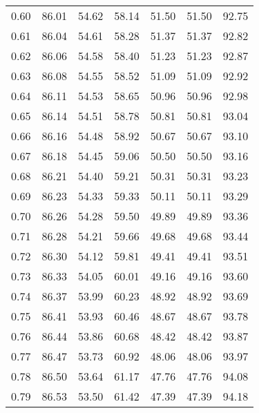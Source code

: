 \begin{tabular}{|c|c|c|c|c|c|c|}
      0.60 &     86.01 &     54.62 &      58.14 &   51.50 &      51.50 &         92.75 \\
      0.61 &     86.04 &     54.61 &      58.28 &   51.37 &      51.37 &         92.82 \\
      0.62 &     86.06 &     54.58 &      58.40 &   51.23 &      51.23 &         92.87 \\
      0.63 &     86.08 &     54.55 &      58.52 &   51.09 &      51.09 &         92.92 \\
      0.64 &     86.11 &     54.53 &      58.65 &   50.96 &      50.96 &         92.98 \\
      0.65 &     86.14 &     54.51 &      58.78 &   50.81 &      50.81 &         93.04 \\
      0.66 &     86.16 &     54.48 &      58.92 &   50.67 &      50.67 &         93.10 \\
      0.67 &     86.18 &     54.45 &      59.06 &   50.50 &      50.50 &         93.16 \\
      0.68 &     86.21 &     54.40 &      59.21 &   50.31 &      50.31 &         93.23 \\
      0.69 &     86.23 &     54.33 &      59.33 &   50.11 &      50.11 &         93.29 \\
      0.70 &     86.26 &     54.28 &      59.50 &   49.89 &      49.89 &         93.36 \\
      0.71 &     86.28 &     54.21 &      59.66 &   49.68 &      49.68 &         93.44 \\
      0.72 &     86.30 &     54.12 &      59.81 &   49.41 &      49.41 &         93.51 \\
      0.73 &     86.33 &     54.05 &      60.01 &   49.16 &      49.16 &         93.60 \\
      0.74 &     86.37 &     53.99 &      60.23 &   48.92 &      48.92 &         93.69 \\
      0.75 &     86.41 &     53.93 &      60.46 &   48.67 &      48.67 &         93.78 \\
      0.76 &     86.44 &     53.86 &      60.68 &   48.42 &      48.42 &         93.87 \\
      0.77 &     86.47 &     53.73 &      60.92 &   48.06 &      48.06 &         93.97 \\
      0.78 &     86.50 &     53.64 &      61.17 &   47.76 &      47.76 &         94.08 \\
      0.79 &     86.53 &     53.50 &      61.42 &   47.39 &      47.39 &         94.18 \\

\end{tabular}
